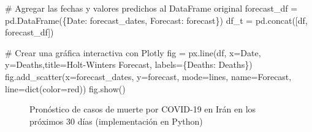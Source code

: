 \documentclass[
  us-letterpaper,
]{scrreprt}
\newenvironment{Shaded}{\begin{snugshade}}{\end{snugshade}}
\newcommand{\BuiltInTok}[1]{\textcolor[rgb]{0.00,0.23,0.31}{#1}}
\newcommand{\CommentTok}[1]{\textcolor[rgb]{0.37,0.37,0.37}{#1}}
\newcommand{\NormalTok}[1]{\textcolor[rgb]{0.00,0.23,0.31}{#1}}
\newcommand{\OperatorTok}[1]{\textcolor[rgb]{0.37,0.37,0.37}{#1}}
\newcommand{\StringTok}[1]{\textcolor[rgb]{0.13,0.47,0.30}{#1}}
\theoremstyle{plain}
\theoremstyle{definition}
\theoremstyle{plain}
\theoremstyle{definition}
\theoremstyle{remark}
\begin{document}
\begin{tcolorbox}
\begin{Shaded}
\begin{Highlighting}[]
\CommentTok{\# Agregar las fechas y valores predichos al DataFrame original}
\NormalTok{forecast\_df }\OperatorTok{=}\NormalTok{ pd.DataFrame(\{}\StringTok{\textquotesingle{}Date\textquotesingle{}}\NormalTok{: forecast\_dates, }
\StringTok{\textquotesingle{}Forecast\textquotesingle{}}\NormalTok{: forecast\})}
\NormalTok{df\_t }\OperatorTok{=}\NormalTok{ pd.concat([df, forecast\_df])}

\CommentTok{\# Crear una gráfica interactiva con Plotly}
\NormalTok{fig }\OperatorTok{=}\NormalTok{ px.line(df, x}\OperatorTok{=}\StringTok{\textquotesingle{}Date\textquotesingle{}}\NormalTok{, y}\OperatorTok{=}\StringTok{\textquotesingle{}Deaths\textquotesingle{}}\NormalTok{,title}\OperatorTok{=}\StringTok{\textquotesingle{}Holt{-}Winters Forecast\textquotesingle{}}\NormalTok{, }
\NormalTok{labels}\OperatorTok{=}\NormalTok{\{}\StringTok{\textquotesingle{}Deaths\textquotesingle{}}\NormalTok{: }\StringTok{\textquotesingle{}Deaths\textquotesingle{}}\NormalTok{\})}
\NormalTok{fig.add\_scatter(x}\OperatorTok{=}\NormalTok{forecast\_dates, y}\OperatorTok{=}\NormalTok{forecast, mode}\OperatorTok{=}\StringTok{\textquotesingle{}lines\textquotesingle{}}\NormalTok{, }
\NormalTok{name}\OperatorTok{=}\StringTok{\textquotesingle{}Forecast\textquotesingle{}}\NormalTok{, line}\OperatorTok{=}\BuiltInTok{dict}\NormalTok{(color}\OperatorTok{=}\StringTok{\textquotesingle{}red\textquotesingle{}}\NormalTok{))}
\NormalTok{fig.show()}
\end{Highlighting}
\end{Shaded}

\end{tcolorbox}

\begin{figure}


\caption{\label{fig-hwf1}Pronóstico de casos de muerte por COVID-19 en
Irán en los próximos 30 días (implementación en Python)}

\end{figure}%
\end{document}
